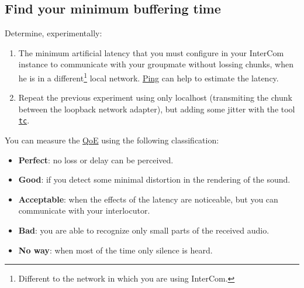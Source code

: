 \subsection*{Find your minimum buffering time}
Determine, experimentally:
\begin{enumerate}
\item The minimum artificial latency that you must configure in your
  InterCom instance to communicate with your groupmate without lossing
  chunks, when he is in a different\footnote{Different to the network
    in which you are using InterCom.} local network. \href{https://vicente-gonzalez-ruiz.github.io/about_ping/}{Ping} can help to estimate the latency.
\item Repeat the previous experiment using only localhost (transmiting
  the chunk between the loopback network adapter), but adding some
  jitter with the tool
  \href{https://vicente-gonzalez-ruiz.github.io/about_tc/}{\texttt{tc}}.
\end{enumerate}

You can measure the \href{https://en.wikipedia.org/wiki/Quality_of_experience}{QoE} using the following classification:
\begin{itemize}
\item \textbf{Perfect}: no loss or delay can be perceived.
\item \textbf{Good}: if you detect some minimal distortion in the
  rendering of the sound.
\item \textbf{Acceptable}: when the effects of the latency are
  noticeable, but you can communicate with your interlocutor.
\item \textbf{Bad}: you are able to recognize only small parts of the
  received audio.
\item \textbf{No way}: when most of the time only silence is heard.
\end{itemize}



